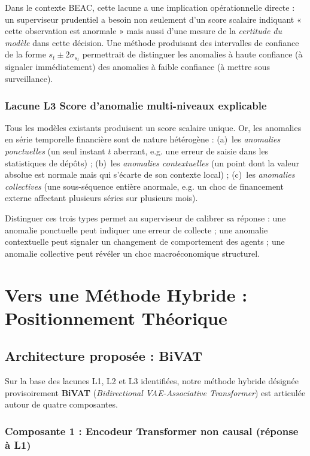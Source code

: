 \documentclass[12pt,a4paper]{article}
\begin{document}
Dans le contexte BEAC, cette lacune a une implication opérationnelle directe : un superviseur prudentiel a besoin non seulement d'un score scalaire indiquant « cette observation est anormale » mais aussi d'une mesure de la \textit{certitude du modèle} dans cette décision. Une méthode produisant des intervalles de confiance de la forme $s_t \pm 2\sigma_{s_t}$ permettrait de distinguer les anomalies à haute confiance (à signaler immédiatement) des anomalies à faible confiance (à mettre sous surveillance).

\subsubsection{Lacune L3 Score d'anomalie multi-niveaux explicable}

Tous les modèles existants produisent un score scalaire unique. Or, les anomalies en série temporelle financière sont de nature hétérogène : (a)~les \textit{anomalies ponctuelles} (un seul instant $t$ aberrant, e.g. une erreur de saisie dans les statistiques de dépôts) ; (b)~les \textit{anomalies contextuelles} (un point dont la valeur absolue est normale mais qui s'écarte de son contexte local) ; (c)~les \textit{anomalies collectives} (une sous-séquence entière anormale, e.g. un choc de financement externe affectant plusieurs séries sur plusieurs mois).

Distinguer ces trois types permet au superviseur de calibrer sa réponse : une anomalie ponctuelle peut indiquer une erreur de collecte ; une anomalie contextuelle peut signaler un changement de comportement des agents ; une anomalie collective peut révéler un choc macroéconomique structurel.

\section{Vers une Méthode Hybride : Positionnement Théorique}

\subsection{Architecture proposée : BiVAT}

Sur la base des lacunes L1, L2 et L3 identifiées, notre méthode hybride  désignée provisoirement \textbf{BiVAT} (\textit{Bidirectional VAE-Associative Transformer})  est articulée autour de quatre composantes.

\subsubsection{Composante 1 : Encodeur Transformer non causal (réponse à L1)}
\end{document}
